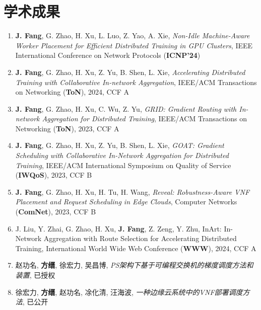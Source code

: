 \documentclass{resume}
\begin{document}
\section{学术成果}

\begin{enumerate}[parsep=0.5ex]
  \item \textbf{J. Fang}, G. Zhao, H. Xu, L. Luo, Z. Yao, A. Xie, \textit{Non-Idle Machine-Aware Worker Placement for Efficient Distributed Training in GPU Clusters}, IEEE International Conference on Network Protocols (\textbf{ICNP'24})
  \item \textbf{J. Fang}, G. Zhao, H. Xu, Z. Yu, B. Shen, L. Xie, \textit{Accelerating Distributed Training with Collaborative In-network Aggregation}, IEEE/ACM Transactions on Networking (\textbf{ToN}), 2024, CCF A
  \item \textbf{J. Fang}, G. Zhao, H. Xu, C. Wu, Z. Yu, \textit{GRID: Gradient Routing with In-network Aggregation for Distributed Training}, IEEE/ACM Transactions on Networking (\textbf{ToN}), 2023, CCF A
  \item \textbf{J. Fang}, G. Zhao, H. Xu, Z. Yu, B. Shen, L. Xie, \textit{GOAT: Gradient Scheduling with Collaborative In-Network Aggregation for Distributed Training}, IEEE/ACM International Symposium on Quality of Service (\textbf{IWQoS}), 2023, CCF B
  \item \textbf{J. Fang}, G. Zhao, H. Xu, H. Tu, H. Wang, \textit{Reveal: Robustness-Aware VNF Placement and Request Scheduling in Edge Clouds}, Computer Networks (\textbf{ComNet}), 2023, CCF B
  \item J. Liu, Y. Zhai, G. Zhao, H. Xu, \textbf{J. Fang}, Z. Zeng, Y. Zhu, InArt: In-Network Aggregation with Route Selection for Accelerating Distributed Training, International World Wide Web Conference (\textbf{WWW}), 2024, CCF A
  \item 赵功名, \textbf{方缙}, 徐宏力, 吴昌博, \textit{PS架构下基于可编程交换机的梯度调度方法和装置}, 已授权
  \item 徐宏力, \textbf{方缙}, 赵功名, 凃化清, 汪海波, \textit{一种边缘云系统中的VNF部署调度方法}, 已公开
\end{enumerate}




\end{document}
